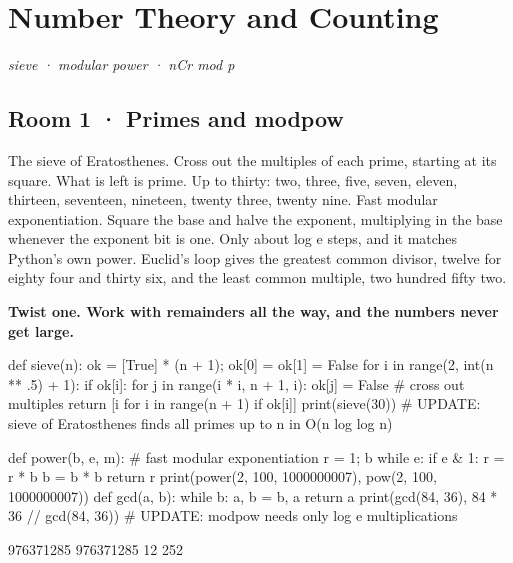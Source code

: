 \documentclass[11pt,a4paper]{report}
\begin{document}
\chapter{Number Theory and Counting}
\textit{sieve · modular power · nCr mod p}
\section*{Room 1 · Primes and modpow}
The sieve of Eratosthenes. Cross out the multiples of each prime, starting at its square. What is left is prime. Up to thirty: two, three, five, seven, eleven, thirteen, seventeen, nineteen, twenty three, twenty nine. Fast modular exponentiation. Square the base and halve the exponent, multiplying in the base whenever the exponent bit is one. Only about log e steps, and it matches Python's own power. Euclid's loop gives the greatest common divisor, twelve for eighty four and thirty six, and the least common multiple, two hundred fifty two.
\begin{tcolorbox}[colback=yellow!12,colframe=orange!70!black,boxrule=0.4pt,left=4pt,right=4pt,top=2pt,bottom=2pt]\textbf{Twist one. Work with remainders all the way, and the numbers never get large.}\end{tcolorbox}
\begin{Code}
def sieve(n):
    ok = [True] * (n + 1); ok[0] = ok[1] = False
    for i in range(2, int(n ** .5) + 1):
        if ok[i]:
            for j in range(i * i, n + 1, i): ok[j] = False   # cross out multiples
    return [i for i in range(n + 1) if ok[i]]
print(sieve(30))
# UPDATE: sieve of Eratosthenes finds all primes up to n in O(n log log n)
\end{Code}
\begin{Out}
[2, 3, 5, 7, 11, 13, 17, 19, 23, 29]
\end{Out}
\begin{Code}
def power(b, e, m):                         # fast modular exponentiation
    r = 1; b %
    while e:
        if e & 1: r = r * b %
        b = b * b %
    return r
print(power(2, 100, 1000000007), pow(2, 100, 1000000007))
def gcd(a, b):
    while b: a, b = b, a %
    return a
print(gcd(84, 36), 84 * 36 // gcd(84, 36))
# UPDATE: modpow needs only log e multiplications
\end{Code}
\begin{Out}
976371285 976371285
12 252
\end{Out}
\end{document}
